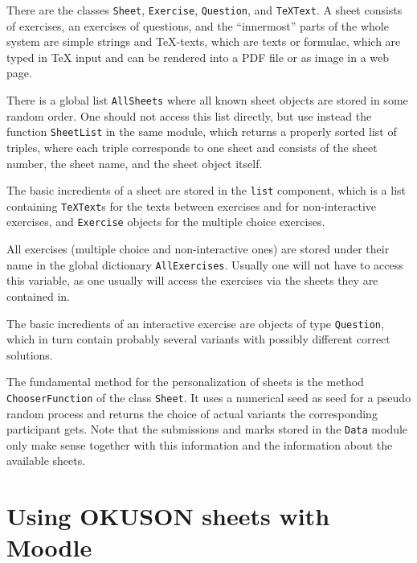 \documentclass[12pt,openany,a4paper]{book}
\begin{document}
There are the classes \texttt{Sheet}, \texttt{Exercise},
\texttt{Question}, and \texttt{TeXText}. A sheet consists of exercises,
an exercises of questions, and the ``innermost'' parts of the whole
system are simple strings and \TeX-texts, which are texts or formulae, which
are typed in {\TeX} input and can be rendered into a PDF file or as
image in a web page.

There is a global list \texttt{AllSheets} where all known sheet
objects are stored in some random order. One should not access this list
directly, but use instead the function \texttt{SheetList} in the same
module, which returns a properly sorted list of triples, where each triple
corresponds to one sheet and consists of the sheet number, the sheet name,
and the sheet object itself.

The basic incredients of a sheet are stored in the \texttt{list} component,
which is a list containing \texttt{TeXText}s for the texts between
exercises and for non-interactive exercises, and \texttt{Exercise} objects
for the multiple choice exercises.

All exercises (multiple choice and non-interactive ones) are stored under
their name in the global dictionary \texttt{AllExercises}. Usually one
will not have to access this variable, as one usually will access the
exercises via the sheets they are contained in.

The basic incredients of an interactive exercise are objects of type
\texttt{Question}, which in turn contain probably several variants
with possibly different correct solutions.

The fundamental method for the personalization of sheets is the method
\texttt{ChooserFunction} of the class \texttt{Sheet}. It uses a numerical
seed as seed for a pseudo random process and returns the choice of actual
variants the corresponding participant gets. Note that the submissions and
marks stored in the \texttt{Data} module only make sense together with this
information and the information about the available sheets.


\chapter{Using OKUSON sheets with Moodle}\label{ch:Moodleexport}
\end{document}
